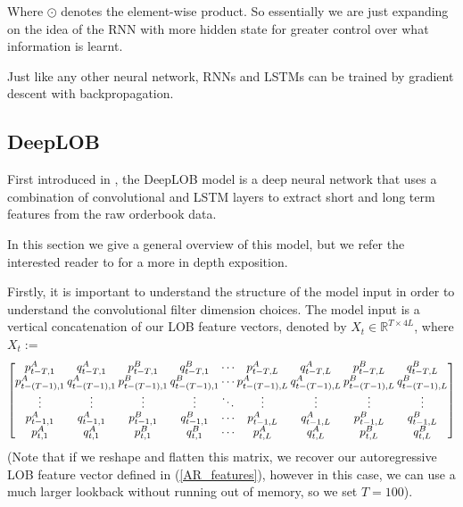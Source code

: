 \documentclass[a4paper, oneside, notitlepage]{book}
\begin{document}
Where $\odot$ denotes the element-wise product. \cite{SCHMIDHUBER1999}
So essentially we are just expanding on the idea of the RNN with more hidden state
for greater control over what information is learnt.

Just like any other neural network, RNNs and LSTMs can be trained by gradient descent
with backpropagation.

\clearpage

\subsection{DeepLOB}
First introduced in \cite{ZHANG2019}, the DeepLOB model is a deep neural network
that uses a combination of convolutional and LSTM layers to extract short and long term
features from the raw orderbook data.

In this section we give a general overview of this model, but we refer the interested
reader to \cite{ZHANG2019} for a more in depth exposition.

Firstly, it is important to understand the structure of the model input in order
to understand the convolutional filter dimension choices.
The model input is a vertical concatenation of our LOB feature
vectors, denoted by $X_t \in \mathbb{R}^{T \times 4L}$, where $X_t :=$
\begin{equation*}
\begingroup
\setlength\arraycolsep{1pt}
\begin{bmatrix}
p_{t-T, 1}^A & q_{t-T, 1}^A & p_{t-T, 1}^B &  q_{t-T, 1}^B &  \cdots & p_{t-T, L}^A &  q_{t-T, L}^A & p_{t-T, L}^B & q_{t-T, L}^B\\
p_{t-(T-1), 1}^A & q_{t-(T-1), 1}^A & p_{t-(T-1), 1}^B &  q_{t-(T-1), 1}^B &  \cdots & p_{t-(T-1), L}^A &  q_{t-(T-1), L}^A & p_{t-(T-1), L}^B & q_{t-(T-1), L}^B\\
\vdots & \vdots & \vdots & \vdots & \ddots & \vdots & \vdots& \vdots & \vdots\\
p_{t-1, 1}^A & q_{t-1, 1}^A & p_{t-1, 1}^B &  q_{t-1, 1}^B &  \cdots & p_{t-1, L}^A &  q_{t-1, L}^A & p_{t-1, L}^B & q_{t-1, L}^B\\
p_{t, 1}^A & q_{t, 1}^A & p_{t, 1}^B &  q_{t, 1}^B &  \cdots & p_{t, L}^A &  q_{t, L}^A & p_{t, L}^B & q_{t, L}^B\\
\end{bmatrix}
\endgroup
\end{equation*}
(Note that if we reshape and flatten this matrix, we recover our autoregressive LOB feature vector defined in (\ref{AR_features}),
however in this case, we can use a much larger lookback without running out of memory, so we set $T=100$).
\end{document}
